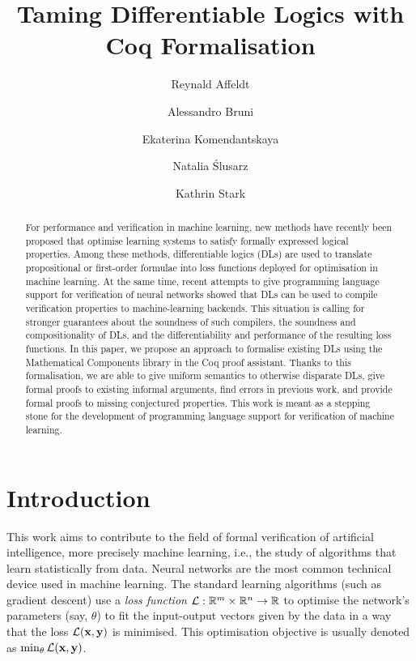 \documentclass[a4paper,UKenglish,cleveref, autoref, thm-restate]{lipics-v2021}
\title{Taming Differentiable Logics with Coq Formalisation} %
\author{Reynald Affeldt}{National Institute of Advanced Industrial Science and 
Technology (AIST)
}{reynald.affeldt@aist.go.jp}{https://orcid.org/0000-0002-2327-953X}{}
\author{Alessandro Bruni}{IT-University of Copenhagen, Denmark}{brun@itu.dk}{https://orcid.org/0000-0003-2946-9462}{}
\author{Ekaterina Komendantskaya}{Southampton University, UK \and 
Heriot-Watt University, 
UK}{e.komendantskaya@soton.ac.uk}{https://orcid.org/0000-0002-3240-0987}{}
\author{Natalia Ślusarz}{Heriot-Watt University, UK} 
{nds1@hw.ac.uk}{https://orcid.org/0000-0001-5729-9208}{}
\author{Kathrin Stark}{Heriot-Watt University, 
UK}{k.stark@hw.ac.uk}{https://orcid.org/0000-0002-7086-6518}{}
\newcommand{\Real}{{\mathbb R}}
\newcommand{\losssymbol}{{\cal L}}
\newcommand{\lossfn}{\losssymbol}
\newcommand{\vect}[1]{\mathbf{#1}}
\newcommand{\x}{\vect{x}} %
\newcommand{\y}{\vect{y}} %
\begin{document}
\maketitle

\begin{abstract}
For performance and verification in machine learning, new
methods have recently been proposed that optimise learning
systems to satisfy formally expressed logical properties.
Among these methods, differentiable logics (DLs) are used to
translate propositional or first-order formulae into loss
functions deployed for optimisation in machine learning.
%
At the same time, recent attempts to give programming language support
for verification of neural networks showed that DLs can be used to
compile verification properties to machine-learning backends.  This
situation is calling for stronger guarantees about the soundness of
such compilers, the soundness and compositionality of DLs, and the
differentiability and performance of the resulting loss functions.  In
this paper, we propose an approach to formalise existing DLs using the
Mathematical Components library in the Coq proof assistant.  Thanks to
this formalisation, we are able to give uniform semantics to otherwise
disparate DLs, give formal proofs to existing informal arguments, find
errors in previous work, and provide formal proofs to missing
conjectured properties.  This work is meant as a stepping stone for
the development of programming language support for verification of
machine learning.
\end{abstract}

\def\newterm#1{{\sl #1}}
\def\mydef{\overset{\textrm{def}}{=}}

\section{Introduction}

This work aims to contribute to the field of formal verification of
artificial intelligence, more precisely machine learning, i.e., the
study of algorithms that learn statistically from data. Neural networks
are the most common technical device used in machine learning.
%
The standard learning algorithms (such as gradient descent) use a
\newterm{loss function}
$\losssymbol: \Real^m \times \Real^n \rightarrow \Real$ to optimise
the network's parameters (say, $\theta$) to fit the input-output
vectors given by the data in a way that the loss $\losssymbol(\x, \y)$
is minimised. This optimisation objective is usually denoted as
$ \min_{\theta} \lossfn(\x, \y) $. 
\end{document}
